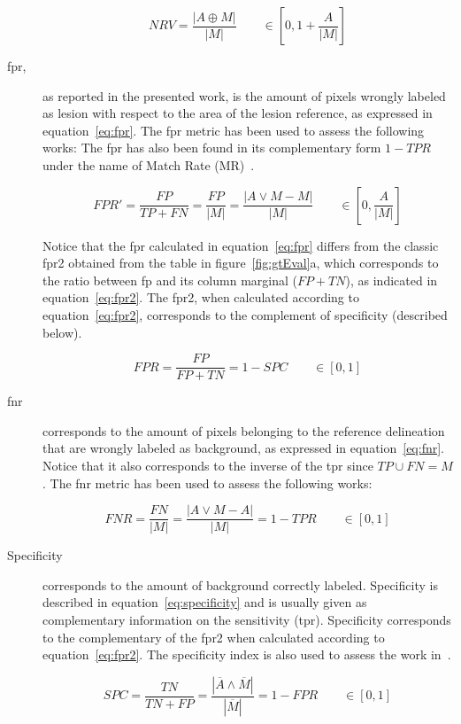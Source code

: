 \begin{description}
\begin{equation}\label{eq:nrv}
NRV = \frac{|A \oplus M|}{|M|} \qquad \in \left[0, 1+\frac{A}{|M|}\right]
\end{equation}


\item[\acf{fpr},]
as reported in the presented work, is the amount of pixels wrongly labeled as lesion with respect to the area of the lesion reference, as expressed in equation~\ref{eq:fpr}. The \ac{fpr} metric has been used to assess the following works:\cite{Madabhushi:2003p6036,Shan:2012p14347,Huang:2012p14313,Liu:2010p14328,Yeh:2009p11985} The \ac{fpr} has also been found in its complementary form $1-TPR$ under the name of Match Rate (MR)~\cite{Huang:2004p2092}.

\begin{equation}\label{eq:fpr}
FPR'= \frac{FP}{TP + FN} = \frac{FP}{|M|}=\frac{|A \vee M - M|}{|M|} \qquad \in \left[0,\frac{A}{|M|}\right]
\end{equation}

Notice that the \ac{fpr} calculated in equation~\ref{eq:fpr} differs from the classic \ac{fpr2} obtained from the table in figure~\ref{fig:gtEval}a, which corresponds to the ratio between \ac{fp} and its column marginal ($FP+TN$), as indicated in equation~\ref{eq:fpr2}. The \ac{fpr2}, when calculated according to equation~\ref{eq:fpr2}, corresponds to the complement of specificity (described below).

\begin{equation}\label{eq:fpr2}
FPR= \frac{FP}{FP + TN} = 1-SPC \qquad \in [0,1]
\end{equation}

\item[\acf{fnr}]
corresponds to the amount of pixels belonging to the reference delineation that are wrongly labeled as background, as expressed in equation~\ref{eq:fnr}. Notice that it also corresponds to the inverse of the \ac{tpr} since $TP \cup FN = M$.
The \ac{fnr} metric has been used to assess the following works:
\cite{Madabhushi:2003p6036,Huang:2012p14313,Yeh:2009p11985}

\begin{equation}\label{eq:fnr}
FNR = \frac{FN}{|M|}=\frac{|A \vee M - A|}{|M|}=1-TPR \qquad \in [0,1]
\end{equation}

\item[Specificity] corresponds to the amount of background correctly labeled. Specificity is described in equation~\ref{eq:specificity} and is usually given as complementary information on the sensitivity (\ac{tpr}). Specificity corresponds to the complementary of the \ac{fpr2} when calculated according to equation~\ref{eq:fpr2}. The specificity index is also used to assess the work in~\cite{gerard2013,Jiang:2012p14354}.

\begin{equation}\label{eq:specificity}
SPC = \frac{TN}{TN+FP} = \frac{|\overline A \wedge \overline M|}{|\overline M|}=1-FPR \qquad \in [0,1]
\end{equation}
\end{description}

